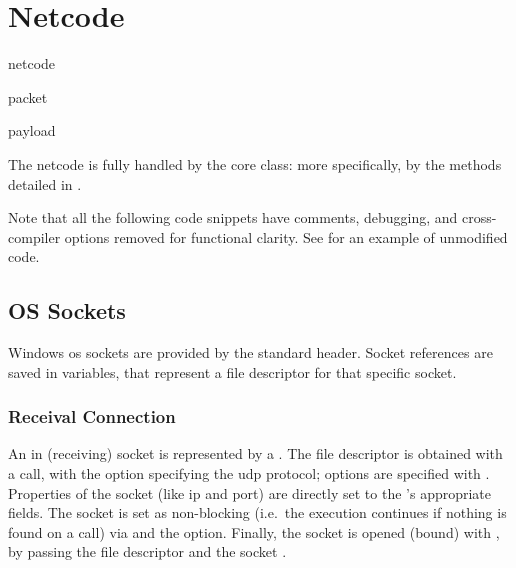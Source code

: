 \section{Netcode}\label{sc:middleware:netcode}

\begin{definition}{netcode}
\end{definition}

\begin{definition}{packet}
\end{definition}

\begin{definition}{payload}
\end{definition}

The netcode is fully handled by the core  class: more specifically, by the methods detailed in .



Note that all the following code snippets have comments, debugging, and cross-compiler options removed for functional clarity. See  for an example of unmodified code.

\subsection{OS Sockets}

Windows \gls{os} sockets are provided by the  standard  header. Socket references are saved in  variables, that represent a file descriptor for that specific socket.

\subsubsection{Receival Connection}

An in (receiving) socket is represented by a . The file descriptor is obtained with a  call, with the  option specifying the \gls{udp} protocol; options are specified with . Properties of the socket (like \gls{ip} and port) are directly set to the 's appropriate fields. The socket is set as non-blocking (i.e.\ the execution continues if nothing is found on a  call) via  and the  option. Finally, the socket is opened (bound) with , by passing the file descriptor and the socket .

